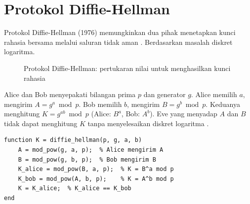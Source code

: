 \section{Protokol Diffie-Hellman}

Protokol Diffie-Hellman (1976) memungkinkan dua pihak menetapkan kunci rahasia bersama melalui saluran tidak aman \cite{diffie1976,katz2020,trappe2006}. Berdasarkan masalah diskret logaritma.

\begin{figure}[!htbp]
\centering
{}
\caption{Protokol Diffie-Hellman: pertukaran nilai untuk menghasilkan kunci rahasia}
\label{fig:dh}
\end{figure}

Alice dan Bob menyepakati bilangan prima $p$ dan generator $g$. Alice memilih $a$, mengirim $A = g^a \bmod p$. Bob memilih $b$, mengirim $B = g^b \bmod p$. Keduanya menghitung $K = g^{ab} \bmod p$ (Alice: $B^a$, Bob: $A^b$). Eve yang menyadap $A$ dan $B$ tidak dapat menghitung $K$ tanpa menyelesaikan diskret logaritma \cite{diffie1976,katz2020,trappe2006}.

\begin{lstlisting}[style=matlab,caption={Diffie-Hellman dalam MATLAB}]
function K = diffie_hellman(p, g, a, b)
    A = mod_pow(g, a, p);  % Alice mengirim A
    B = mod_pow(g, b, p);  % Bob mengirim B
    K_alice = mod_pow(B, a, p);  % K = B^a mod p
    K_bob = mod_pow(A, b, p);    % K = A^b mod p
    K = K_alice;  % K_alice == K_bob
end
\end{lstlisting}
